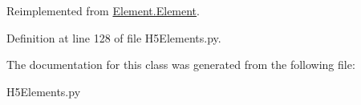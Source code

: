 Reimplemented from \hyperlink{classElement_1_1Element_a359371465b7c4d21611adec7e86c3b33}{Element.Element}.

Definition at line 128 of file H5Elements.py.

The documentation for this class was generated from the following file:\begin{DoxyCompactItemize}
\item 
H5Elements.py\end{DoxyCompactItemize}
